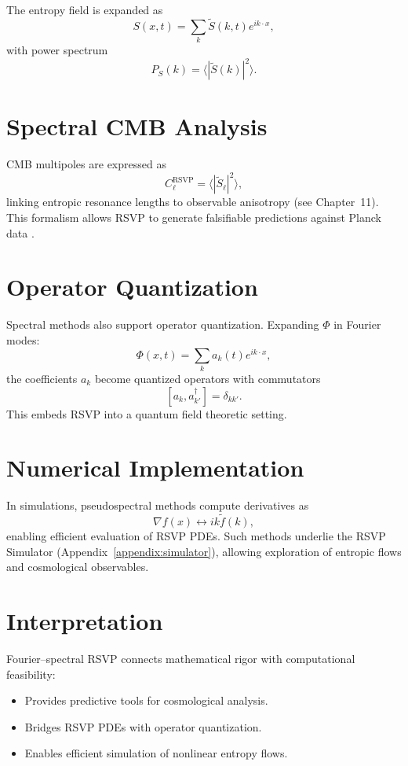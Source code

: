\documentclass[12pt]{report}
\begin{document}
The entropy field is expanded as
\begin{equation}
S(x,t) = \sum_{k} \tilde{S}(k,t) e^{i k \cdot x},
\end{equation}
with power spectrum
\begin{equation}
P_S(k) = \langle |\tilde{S}(k)|^2 \rangle.
\end{equation}

\section{Spectral CMB Analysis}

CMB multipoles are expressed as
\begin{equation}
C_\ell^{\text{RSVP}} = \langle |\tilde{S}_\ell|^2 \rangle,
\end{equation}
linking entropic resonance lengths to observable anisotropy (see Chapter~11).  
This formalism allows RSVP to generate falsifiable predictions against Planck data \citep{Planck2020}.

\section{Operator Quantization}

Spectral methods also support operator quantization. Expanding $\Phi$ in Fourier modes:
\[
\Phi(x,t) = \sum_k a_k(t) e^{i k \cdot x},
\]
the coefficients $a_k$ become quantized operators with commutators
\[
[a_k, a^\dagger_{k'}] = \delta_{kk'}.
\]
This embeds RSVP into a quantum field theoretic setting.

\section{Numerical Implementation}

In simulations, pseudospectral methods compute derivatives as
\[
\nabla f(x) \leftrightarrow i k \tilde{f}(k),
\]
enabling efficient evaluation of RSVP PDEs.  
Such methods underlie the RSVP Simulator (Appendix~\ref{appendix:simulator}), allowing exploration of entropic flows and cosmological observables.

\section{Interpretation}

Fourier--spectral RSVP connects mathematical rigor with computational feasibility:
\begin{itemize}
    \item Provides predictive tools for cosmological analysis.
    \item Bridges RSVP PDEs with operator quantization.
    \item Enables efficient simulation of nonlinear entropy flows.
\end{itemize}
\end{document}
